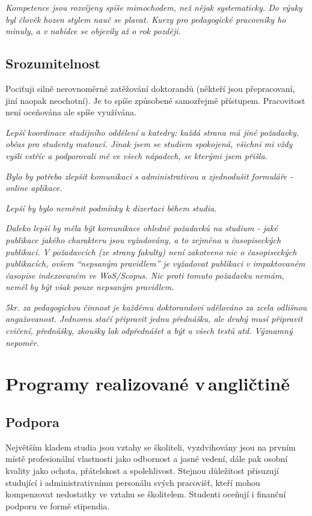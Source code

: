 \documentclass[
  czech,
  14pt,
  a4paper,
  DIV=11,
  numbers=noendperiod]{scrreprt}
\begin{document}
\emph{Kompetence jsou rozvíjeny spíše mimochodem, než nějak
systematicky. Do výuky byl člověk hozen stylem nauč se plavat. Kurzy pro
pedagogické pracovníky ho minuly, a v nabídce se objevily až o rok
později.}

\subsection{Srozumitelnost}\label{srozumitelnost}

Pociťuji silně nerovnoměrné zatěžování doktorandů (někteří jsou
přepracovaní, jiní naopak neochotní). Je to spíše způsobené samozřejmě
přístupem. Pracovitost není oceňována ale spíše využívána.

\emph{Lepší koordinace studijního oddělení a katedry: každá strana má
jiné požadavky, občas pro studenty matoucí. Jinak jsem se studiem
spokojená, všichni mi vždy vyšli vstříc a podporovali mě ve všech
nápadech, se kterými jsem přišla.}

\emph{Bylo by potřeba zlepšit komunikaci s administrativou a zjednodušit
formuláře - online aplikace.}

\emph{Lepší by bylo neměnit podmínky k dizertaci během studia.}

\emph{Daleko lepší by měla být komunikace ohledně požadavků na studium -
jaké publikace jakého charakteru jsou vyžadovány, a to zejména u
časopiseckých publikací. V požadavcích (ze strany fakulty) není
zakotveno nic o časopiseckých publikacích, ovšem ``nepsaným pravidlem''
je vyžadovat publikaci v impaktovaném časopise indexovaném ve
WoS/Scopus. Nic proti tomuto požadavku nemám, neměl by být však pouze
nepsaným pravidlem.}

\emph{5kr. za pedagogickou činnost je každému doktorandovi udělováno za
zcela odlišnou angažovanost. Jednomu stačí připravit jednu přednášku,
ale druhý musí připravit cvičení, přednášky, zkoušky lak odpřednášet a
být u všech testů atd. Významný nepoměr.}

\section{Programy realizované
v\,angličtině}\label{programy-realizovanuxe9-v-angliux10dtinux11b}

\subsection{Podpora}\label{podpora-1}

Největším kladem studia jsou vztahy se školiteli, vyzdvihovány jsou na
prvním místě profesionální vlastnosti jako odbornost a jasné vedení,
dále pak osobní kvality jako ochota, přátelskost a spolehlivost. Stejnou
důležitost přisuzují studující i administrativnímu personálu svých
pracovišť, kteří mohou kompenzovat nedostatky ve vztahu se školitelem.
Studenti oceňují i finanční podporu ve formě stipendia.
\end{document}
